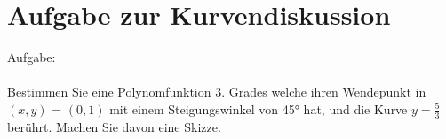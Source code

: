 



\section{Aufgabe zur Kurvendiskussion}
Aufgabe: \\\\
Bestimmen Sie eine Polynomfunktion 3. Grades welche ihren Wendepunkt in $(x, y)$ = $(0, 1)$ mit einem Steigungswinkel von 45° hat, und die Kurve $y = \frac{5}{3}$ berührt. Machen Sie davon eine Skizze.\\\\

